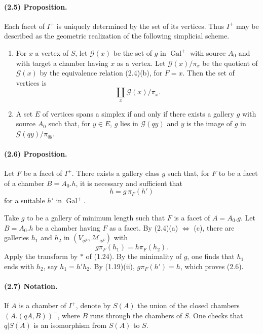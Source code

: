 \documentclass[10pt]{article}
\begin{document}
\paragraph{(2.5) Proposition.} Each facet of \(I^+\) is uniquely determined by the set of its vertices. Thus \(I^+\) may be described as the geometric realization of the following simplicial scheme.
\begin{enumerate}[label=\alph*)]
\item For \(x\) a vertex of \(S\), let \(\mathcal G(x)\) be the set of \(g\) in \(\operatorname{Gal}^+\) with source \(A_0\) and with target a chamber having \(x\) as a vertex. Let \(\mathcal G(x)/\pi_x\) be the quotient of \(\mathcal G(x)\) by the equivalence relation (2.4)(b), for \(F=x\). Then the set of vertices is
\[
\coprod_x \mathcal G(x)/\pi_x.
\]
\item A set \(E\) of vertices spans a simplex if and only if there exists a gallery \(g\) with source \(A_0\) such that, for \(y\in E\), \(g\) lies in \(\mathcal G(qy)\) and \(y\) is the image of \(g\) in \(\mathcal G(qy)/\pi_{qy}\).
\end{enumerate}

\paragraph{(2.6) Proposition.} Let \(F\) be a facet of \(I^+\). There exists a gallery class \(g\) such that, for \(F\) to be a facet of a chamber \(B=A_0.h\), it is necessary and sufficient that
\[
h=g\,\pi_F(h')
\]
for a suitable \(h'\) in \(\operatorname{Gal}^+\).

Take \(g\) to be a gallery of minimum length such that \(F\) is a facet of \(A=A_0.g\). Let \(B=A_0.h\) be a chamber having \(F\) as a facet. By (2.4)(a) \(\Leftrightarrow\) (c), there are galleries \(h_1\) and \(h_2\) in \((V_{qF},\mathcal M_{qF})\) with
\[
g\pi_F(h_1)=h\pi_F(h_2).
\]
Apply the transform by \(*\) of (1.24). By the minimality of \(g\), one finds that \(h_1\) ends with \(h_2\), say \(h_1=h'h_2\). By (1.19)(ii), \(g\pi_F(h')=h\), which proves (2.6).

\paragraph{(2.7) Notation.} If \(A\) is a chamber of \(I^+\), denote by \(S(A)\) the union of the closed chambers \((A.(qA,B))^{-}\), where \(B\) runs through the chambers of \(S\). One checks that \(q|S(A)\) is an isomorphism from \(S(A)\) to \(S\).
\end{document}
